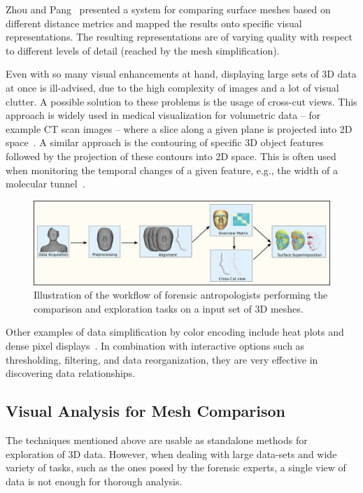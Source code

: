 \documentclass[final,5p,times]{elsarticle}
\begin{document}
Zhou and Pang~\cite{Zhou2001} presented a system for comparing surface meshes based on different distance metrics and mapped the results onto specific visual representations.
The resulting representations are of varying quality with respect to different levels of detail (reached by the mesh simplification).

Even with so many visual enhancements at hand, displaying large sets of 3D data at once is ill-advised, due to the high complexity of images and a lot of visual clutter. 
A possible solution to these problems is the usage of cross-cut views. 
This approach is widely used in medical visualization for volumetric data -- for example CT scan images -- where a slice along a given plane is projected into 2D space~\cite{friese2011yadiv}. 
A similar approach is the contouring of specific 3D object features followed by the projection of these contours into 2D space.
This is often used when monitoring the temporal changes of a given feature, e.g., the width of a molecular tunnel~\cite{byska}.

\begin{figure}[tbh]
	\centering
  \includegraphics[width=1\linewidth]{pictures/pipeline.png}
  \caption{\label{fig:pipeline1} Illustration of the workflow of forensic antropologists performing the comparison and exploration tasks on a input set of 3D meshes.}
\end{figure}

Other examples of data simplification by color encoding include heat plots and dense pixel displays~\cite{byska,ivanisiev,zhai}. 
In combination with interactive options such as thresholding, filtering, and data reorganization, they are very effective in discovering data relationships.

\subsection{Visual Analysis for Mesh Comparison}
The techniques mentioned above are usable as standalone methods for exploration of 3D data.
However, when dealing with large data-sets and wide variety of tasks, such as the ones posed by the forensic experts, a single view of data is not enough for thorough analysis.
\end{document}
